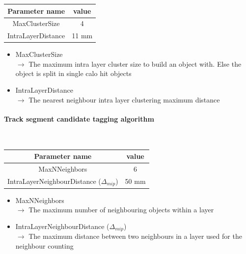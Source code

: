 \documentclass[cits]{JINST}
\begin{document}
\begin{table}[!h]
  \begin{center}
    \begin{tabu} to \linewidth { c | c } 
          Parameter name & value \\
          \hline
          MaxClusterSize & 4 \\
          IntraLayerDistance & 11 mm
    \end{tabu} 
  \end{center}
\end{table}

\begin{itemize}
 \item MaxClusterSize \\
 $\rightarrow$ The maximum intra layer cluster size to build an object with. Else the object is split in single calo hit objects
 \item IntraLayerDistance \\
 $\rightarrow$ The nearest neighbour intra layer clustering maximum distance
\end{itemize}


\paragraph{Track segment candidate tagging algorithm} ~

\begin{table}[!h]
  \begin{center}
    \begin{tabu} to \linewidth { c | c } 
          Parameter name & value \\
          \hline
          MaxNNeighbors & 6 \\
          IntraLayerNeighbourDistance ($\Delta_{mip}$) & 50 mm
    \end{tabu} 
  \end{center}
\end{table}

\begin{itemize}
  \item MaxNNeighbors \\
  $\rightarrow$ The maximum number of neighbouring objects within a layer
  \item IntraLayerNeighbourDistance ($\Delta_{mip}$) \\
  $\rightarrow$ The maximum distance between two neighbours in a layer used for the neighbour counting
\end{itemize}
\end{document}
